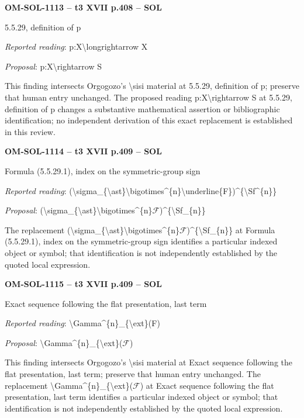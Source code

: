 \par\noindent\textbf{OM-SOL-1113 -- t3 XVII p.408 -- SOL}\par
5.5.29, definition of p\par
\emph{Reported reading}: p:X\textbackslash{}longrightarrow X\par
\emph{Proposal}: p:X\textbackslash{}rightarrow S\par
This finding intersects Orgogozo's \textbackslash{}sisi material at 5.5.29, definition of p; preserve that human entry unchanged. The proposed reading p:X\textbackslash{}rightarrow S at 5.5.29, definition of p changes a substantive mathematical assertion or bibliographic identification; no independent derivation of this exact replacement is established in this review.\par
\par\noindent\textbf{OM-SOL-1114 -- t3 XVII p.409 -- SOL}\par
Formula (5.5.29.1), index on the symmetric-group sign\par
\emph{Reported reading}: (\textbackslash{}sigma\_\{\textbackslash{}ast\}\textbackslash{}bigotimes\textasciicircum{}\{n\}\textbackslash{}underline\{F\})\textasciicircum{}\{\textbackslash{}Sf\textasciicircum{}\{n\}\}\par
\emph{Proposal}: (\textbackslash{}sigma\_\{\textbackslash{}ast\}\textbackslash{}bigotimes\textasciicircum{}\{n\}\ensuremath{\mathcal{F}})\textasciicircum{}\{\textbackslash{}Sf\_\{n\}\}\par
The replacement (\textbackslash{}sigma\_\{\textbackslash{}ast\}\textbackslash{}bigotimes\textasciicircum{}\{n\}\ensuremath{\mathcal{F}})\textasciicircum{}\{\textbackslash{}Sf\_\{n\}\} at Formula (5.5.29.1), index on the symmetric-group sign identifies a particular indexed object or symbol; that identification is not independently established by the quoted local expression.\par
\par\noindent\textbf{OM-SOL-1115 -- t3 XVII p.409 -- SOL}\par
Exact sequence following the flat presentation, last term\par
\emph{Reported reading}: \textbackslash{}Gamma\textasciicircum{}\{n\}\_\{\textbackslash{}ext\}(F)\par
\emph{Proposal}: \textbackslash{}Gamma\textasciicircum{}\{n\}\_\{\textbackslash{}ext\}(\ensuremath{\mathcal{F}})\par
This finding intersects Orgogozo's \textbackslash{}sisi material at Exact sequence following the flat presentation, last term; preserve that human entry unchanged. The replacement \textbackslash{}Gamma\textasciicircum{}\{n\}\_\{\textbackslash{}ext\}(\ensuremath{\mathcal{F}}) at Exact sequence following the flat presentation, last term identifies a particular indexed object or symbol; that identification is not independently established by the quoted local expression.\par
